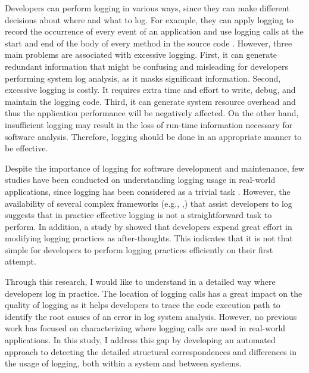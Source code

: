 Developers can perform logging in various ways, since they can make different decisions about where and what to log. For example, they can apply logging to record the occurrence of every event of an application and use logging calls at the start and end of the body of every method in the source code \cite{clarke1999dimension,clarke1999subject}. However, three main problems are associated with excessive logging. First, it can generate redundant information that might be confusing and misleading for developers performing system log analysis, as it masks significant information. Second, excessive logging is costly. It requires extra time and effort to write, debug, and maintain the logging code. Third, it can generate system resource overhead and thus the application performance will be negatively affected. On the other hand, insufficient logging may result in the loss of run-time information necessary for software analysis.
Therefore, logging should be done in an appropriate manner to be effective.

Despite the importance of logging for software development and maintenance, few studies have been conducted on understanding logging usage in real-world applications, since logging has been considered as a trivial task \cite{clarke1999dimension,clarke1999subject}. However, the availability of several complex frameworks (e.g., ,) that assist developers to log suggests that in practice effective logging is not a straightforward task to perform. In addition, a study by \citet{yuan2012characterizing} showed that developers expend great effort in modifying logging practices as after-thoughts. This indicates that it is not that simple for developers to perform logging practices efficiently on their first attempt.

Through this research, I would like to understand in a detailed way where developers log in practice. The location of logging calls has a great impact on the quality of logging as it helps developers to trace the code execution path to identify the root causes of an error in log system analysis. However, no previous work has focused on characterizing where logging calls are used in real-world applications.
In this study, I address this gap by developing an automated approach to detecting the detailed structural correspondences and differences in the usage of logging, both within a system and between systems.


